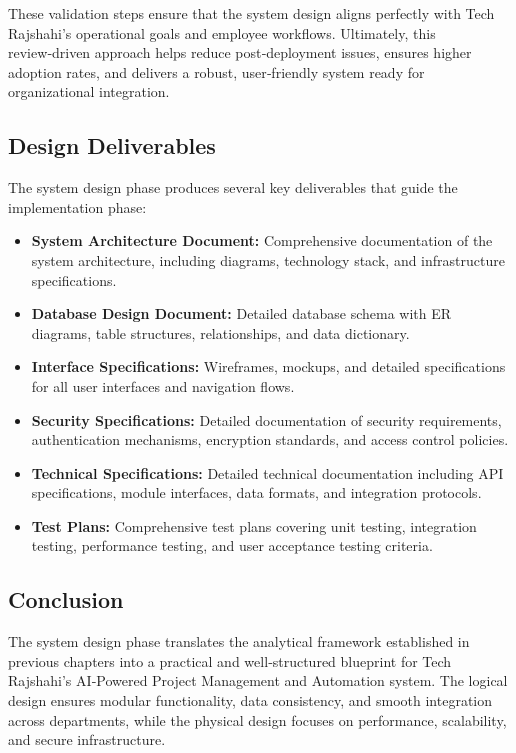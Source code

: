 \documentclass[12pt,a4paper]{article}
\begin{document}
These validation steps ensure that the system design aligns perfectly with Tech Rajshahi's operational goals and employee workflows.  Ultimately, this review‑driven approach helps reduce post‑deployment issues, ensures higher adoption rates, and delivers a robust, user‑friendly system ready for organizational integration.

\subsection{Design Deliverables}
The system design phase produces several key deliverables that guide the implementation phase:

\begin{itemize}
    \item \textbf{System Architecture Document:} Comprehensive documentation of the system architecture, including diagrams, technology stack, and infrastructure specifications.
    
    \item \textbf{Database Design Document:} Detailed database schema with ER diagrams, table structures, relationships, and data dictionary.
    
    \item \textbf{Interface Specifications:} Wireframes, mockups, and detailed specifications for all user interfaces and navigation flows.
    
    \item \textbf{Security Specifications:} Detailed documentation of security requirements, authentication mechanisms, encryption standards, and access control policies.
    
    \item \textbf{Technical Specifications:} Detailed technical documentation including API specifications, module interfaces, data formats, and integration protocols.
    
    \item \textbf{Test Plans:} Comprehensive test plans covering unit testing, integration testing, performance testing, and user acceptance testing criteria.
\end{itemize}

\subsection{Conclusion}
The system design phase translates the analytical framework established in previous chapters into a practical and well‑structured blueprint for Tech Rajshahi's AI‑Powered Project Management and Automation system.  The logical design ensures modular functionality, data consistency, and smooth integration across departments, while the physical design focuses on performance, scalability, and secure infrastructure.  
\end{document}
